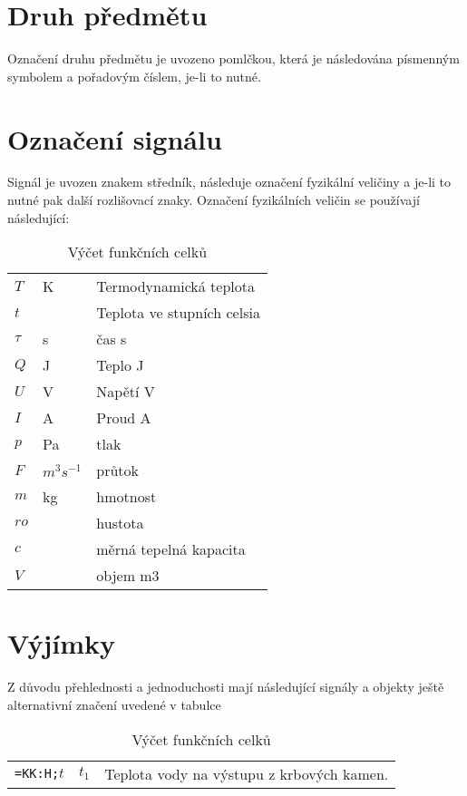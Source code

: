 \documentclass{book}
\begin{document}
\section{Druh předmětu}

    Označení druhu předmětu je uvozeno pomlčkou, která je následována
    písmenným symbolem a pořadovým číslem, je-li to nutné.

\section{Označení signálu}

    Signál je uvozen znakem středník, následuje označení fyzikální veličiny
    a je-li to nutné pak další rozlišovací znaky. Označení fyzikálních veličin
    se používají následující:

\begin{table}[]
  \centering
    \begin{tabular}{l l l}
$T$ & K & Termodynamická teplota\\
$t$ & & Teplota ve stupních celsia\\
$\tau$ & s & čas s\\
$Q$ & J & Teplo J\\
$U$ & V & Napětí V\\
$I$ & A &Proud A\\
$p$ & Pa & tlak\\
$F$ & $m^3 s^{-1}$ & průtok\\
$m$ & kg & hmotnost\\
$ro$ & & hustota\\
$c$ & & měrná tepelná kapacita\\
$V$ & & objem m3\\
    \end{tabular}
  \caption{Výčet funkčních celků}
  \label{tab:myfirsttable}
\end{table}

\section{Výjímky}

    Z důvodu přehlednosti a jednoduchosti mají následující signály a objekty
    ještě alternativní značení uvedené v tabulce

\begin{table}[]
  \centering
    \begin{tabular}{ l l l}
        \texttt{=KK:H;}$t$\index{$t_1$|see {=KK:H;t}} & $t_1$ & Teplota vody na výstupu z krbových kamen.
    \end{tabular}
  \caption{Výčet funkčních celků}
  \label{tab:myfirsttable}
\end{table}
\end{document}
